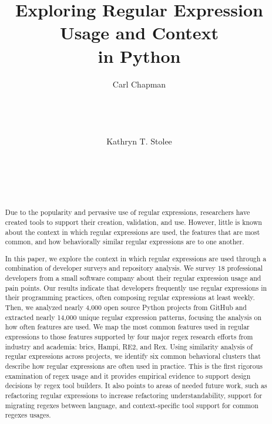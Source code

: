 \documentclass{sig-alternate-05-2015}
\begin{document}
\title{Exploring  Regular Expression Usage and Context\\ in Python}

\author{
\alignauthor
Carl Chapman\\
      \\
      \\
      \\
     \\
\alignauthor
Kathryn T. Stolee\\
      \\
      \\
      \\
     \\
}
\maketitle


\begin{abstract}
Due to the popularity and pervasive use of regular expressions, researchers have created tools to support their creation, validation, and use. However, little is known about the context in which regular expressions are used, the features that are most common, and how behaviorally similar regular expressions are to one another.

In this paper, we explore the context in which regular expressions are used through a combination of developer surveys and repository analysis.
We survey 18 professional developers from a small software company about their regular expression usage and pain points.
Our results indicate that developers frequently use regular expressions in their programming practices, often composing regular expressions at least weekly.
Then, we
analyzed nearly 4,000 open source Python projects from GitHub and extracted nearly 14,000 unique regular expression patterns, focusing the analysis on how often features are used.
We  map the most common features used in regular expressions to those features supported by four major regex research efforts from industry and academia: brics, Hampi, RE2, and Rex.
Using similarity analysis of regular expressions across projects,
we identify six common behavioral clusters that describe how regular expressions are often used in practice.
This is the first rigorous examination of regex usage and it provides empirical evidence to support design decisions by regex tool
builders. It also points to areas of needed future work, such as refactoring regular expressions to increase refactoring understandability, support for migrating regexes between language, and context-specific tool support for common regexes usages.
\end{abstract}
\end{document}
